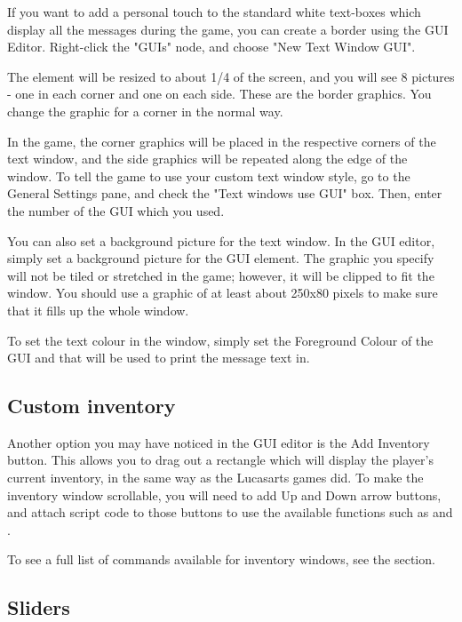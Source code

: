 If you want to add a personal touch to the standard white text-boxes which
display all the messages during the game, you can create a border using the
GUI Editor. Right-click the "GUIs" node, and choose "New Text Window GUI".

The element will be resized to about 1/4 of the screen, and you will see 8
pictures - one in each corner and one on each side. These are the border
graphics. You change the graphic for a corner in the normal way.

In the game, the corner graphics will be placed in the respective corners of
the text window, and the side graphics will be repeated along the edge of
the window. To tell the game to use your custom text window style, go to the
General Settings pane, and check the "Text windows use GUI" box. Then, enter
the number of the GUI which you used.

You can also set a background picture for the text window. In the GUI editor,
simply set a background picture for the GUI element. The graphic you specify
will not be tiled or stretched in the game; however, it will be clipped to
fit the window. You should use a graphic of at least about 250x80 pixels to
make sure that it fills up the whole window.

To set the text colour in the window, simply set the Foreground Colour of
the GUI and that will be used to print the message text in.

\subsection{Custom inventory}%

Another option you may have noticed in the GUI editor is the Add Inventory
button. This allows you to drag out a rectangle which will display the
player's current inventory, in the same way as the Lucasarts games did. To
make the inventory window scrollable, you will need to add Up and Down arrow
buttons, and attach script code to those buttons to use the available
functions such as  and
.

To see a full list of commands available for inventory windows, see
the  section.

\subsection{Sliders}%

